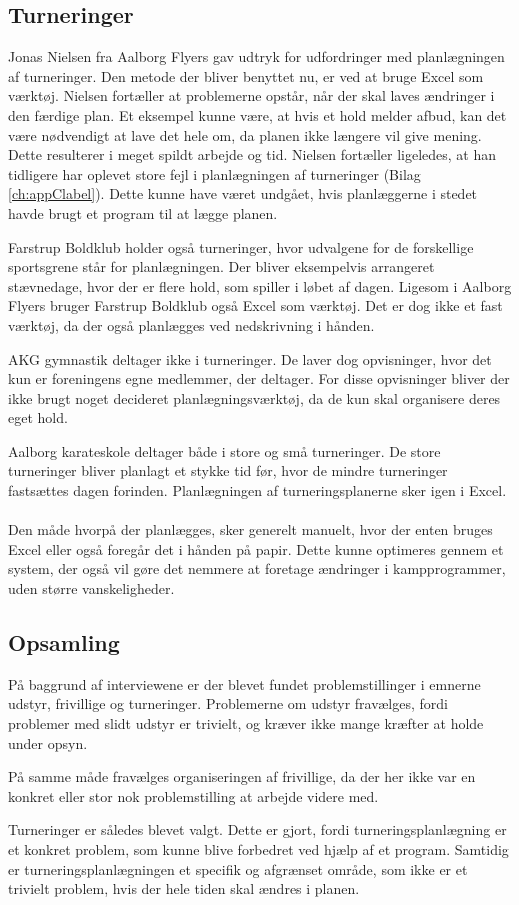 \subsection*{Turneringer}
Jonas Nielsen fra Aalborg Flyers gav udtryk for udfordringer med planlægningen af turneringer. Den metode der bliver benyttet nu, er ved at bruge Excel som værktøj. Nielsen fortæller at problemerne opstår, når der skal laves ændringer i den færdige plan. Et eksempel kunne være, at hvis et hold melder afbud, kan det være nødvendigt at lave det hele om, da planen ikke længere vil give mening. Dette resulterer i meget spildt arbejde og tid. Nielsen fortæller ligeledes, at han tidligere har oplevet store fejl i planlægningen af turneringer (Bilag \ref{ch:appClabel}). Dette kunne have været undgået, hvis planlæggerne i stedet havde brugt et program til at lægge planen.
\par
Farstrup Boldklub holder også turneringer, hvor udvalgene for de forskellige sportsgrene står for planlægningen. Der bliver eksempelvis arrangeret stævnedage, hvor der er flere hold, som spiller i løbet af dagen. Ligesom i Aalborg Flyers bruger Farstrup Boldklub også Excel som værktøj. Det er dog ikke et fast værktøj, da der også planlægges ved nedskrivning i hånden.
\par
AKG gymnastik deltager ikke i turneringer. De laver dog opvisninger, hvor det kun er foreningens egne medlemmer, der deltager. For disse opvisninger bliver der ikke brugt noget decideret planlægningsværktøj, da de kun skal organisere deres eget hold. %
\par
Aalborg karateskole deltager både i store og små turneringer. De store turneringer bliver planlagt et stykke tid før, hvor de mindre turneringer fastsættes dagen forinden. Planlægningen af turneringsplanerne sker igen i Excel. 
\\\\
Den måde hvorpå der planlægges, sker generelt manuelt, hvor der enten bruges Excel eller også foregår det i hånden på papir. Dette kunne optimeres gennem et system, der også vil gøre det nemmere at foretage ændringer i kampprogrammer, uden større vanskeligheder.

\subsection*{Opsamling}
På baggrund af interviewene er der blevet fundet problemstillinger i emnerne udstyr, frivillige og turneringer. Problemerne om udstyr fravælges, fordi problemer med slidt udstyr er trivielt, og kræver ikke mange kræfter at holde under opsyn.
\par
På samme måde fravælges organiseringen af frivillige, da der her ikke var en konkret eller stor nok problemstilling at arbejde videre med.
\par
Turneringer er således blevet valgt. Dette er gjort, fordi turneringsplanlægning er et konkret problem, som kunne blive forbedret ved hjælp af et program. Samtidig er turneringsplanlægningen et specifik og afgrænset område, som ikke er et trivielt problem, hvis der hele tiden skal ændres i planen.

